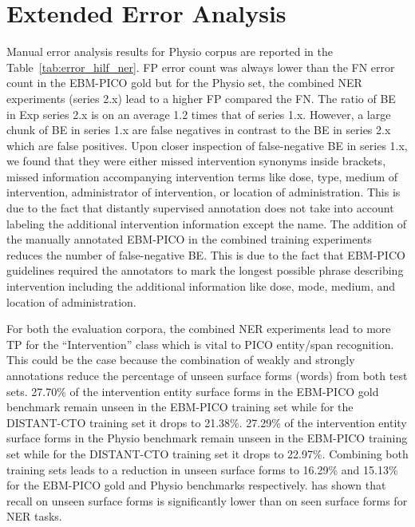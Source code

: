 \documentclass[11pt]{article}
\begin{document}
\section{Extended Error Analysis}
\label{error_extended}
%
Manual error analysis results for Physio corpus are reported in the Table~\ref{tab:error_hilf_ner}.
FP error count was always lower than the FN error count in the EBM-PICO gold but for the Physio set, the combined NER experiments (series 2.x) lead to a higher FP compared the FN.
The ratio of BE in Exp series 2.x is on an average 1.2 times that of series 1.x.
However, a large chunk of BE in series 1.x are false negatives in contrast to the BE in series 2.x which are false positives.
Upon closer inspection of false-negative BE in series 1.x, we found that they were either missed intervention synonyms inside brackets, missed information accompanying intervention terms like dose, type, medium of intervention, administrator of intervention, or location of administration.
This is due to the fact that distantly supervised annotation does not take into account labeling the additional intervention information except the name.
The addition of the manually annotated EBM-PICO in the combined training experiments reduces the number of false-negative BE.
This is due to the fact that EBM-PICO guidelines required the annotators to mark the longest possible phrase describing intervention including the additional information like dose, mode, medium, and location of administration.


For both the evaluation corpora, the combined NER experiments lead to more TP for the ``Intervention'' class which is vital to PICO entity/span recognition.
This could be the case because the combination of weakly and strongly annotations reduce the percentage of unseen surface forms (words) from both test sets.
27.70\% of the intervention entity surface forms in the EBM-PICO gold benchmark remain unseen in the EBM-PICO training set while for the DISTANT-CTO training set it drops to 21.38\%.
27.29\% of the intervention entity surface forms in the Physio benchmark remain unseen in the EBM-PICO training set while for the DISTANT-CTO training set it drops to 22.97\%.
Combining both training sets leads to a reduction in unseen surface forms to 16.29\% and 15.13\% for the EBM-PICO gold and Physio benchmarks respectively.
\cite{augenstein2017generalisation} has shown that recall on unseen surface forms is significantly lower than on seen surface forms for NER tasks.
\end{document}
